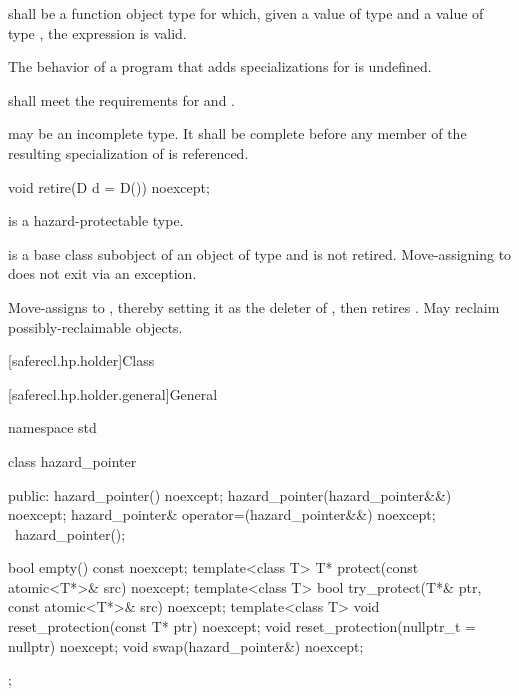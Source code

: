\pnum
{} shall be a function object type
for which, given a value  of type  and
a value  of type ,
the expression  is valid.

\pnum
The behavior of a program
that adds specializations for  is undefined.

\pnum
{} shall meet the requirements for
 and .

\pnum
{} may be an incomplete type.
It shall be complete before any member
of the resulting specialization of 
is referenced.

%
\begin{itemdecl}
void retire(D d = D()) noexcept;
\end{itemdecl}

\begin{itemdescr}
\pnum
\mandates
{} is a hazard-protectable type.

\pnum
\expects
{} is
a base class subobject of an object  of type  and
 is not retired.
Move-assigning  to  does not exit via an exception.

\pnum
\effects
Move-assigns  to ,
thereby setting it as the deleter of ,
then retires .
May reclaim possibly-reclaimable objects.
\end{itemdescr}

[saferecl.hp.holder]{Class }

[saferecl.hp.holder.general]{General}

\begin{codeblock}
namespace std {
  class hazard_pointer {
  public:
    hazard_pointer() noexcept;
    hazard_pointer(hazard_pointer&&) noexcept;
    hazard_pointer& operator=(hazard_pointer&&) noexcept;
    ~hazard_pointer();

    bool empty() const noexcept;
    template<class T> T* protect(const atomic<T*>& src) noexcept;
    template<class T> bool try_protect(T*& ptr, const atomic<T*>& src) noexcept;
    template<class T> void reset_protection(const T* ptr) noexcept;
    void reset_protection(nullptr_t = nullptr) noexcept;
    void swap(hazard_pointer&) noexcept;
  };
}
\end{codeblock}

